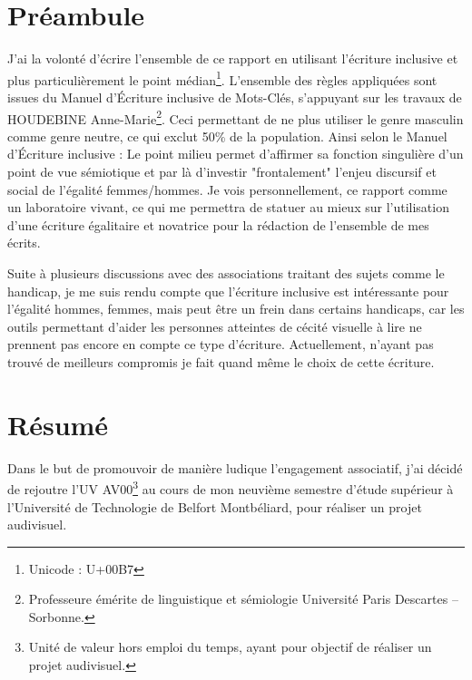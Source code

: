 \documentclass{librairies/lib}
\begin{document}



\newpage
\pagestyle{no_number}

\section*{Préambule}

J'ai la volonté d'écrire l'ensemble de ce rapport en utilisant l'écriture inclusive et plus particulièrement le point médian\footnote{Unicode : U+00B7}.
L'ensemble des règles appliquées sont issues du Manuel d’Écriture inclusive\cite{MEI} de Mots-Clés, s'appuyant sur les travaux de HOUDEBINE Anne-Marie\footnote{Professeure émérite de linguistique et sémiologie Université Paris Descartes – Sorbonne.}.
Ceci permettant de ne plus utiliser le genre masculin comme genre neutre, ce qui exclut 50\% de la population.
Ainsi selon le Manuel d’Écriture inclusive : \og Le point milieu permet d'affirmer sa fonction singulière d'un point de vue sémiotique et par là d'investir "frontalement" l'enjeu discursif et social de l'égalité femmes/hommes. \fg{}
Je vois personnellement, ce rapport comme un laboratoire vivant, ce qui me permettra de statuer au mieux sur l'utilisation d'une écriture égalitaire et novatrice pour la rédaction de l'ensemble de mes écrits.

Suite à plusieurs discussions avec des associations traitant des sujets comme le handicap, je me suis rendu compte que l'écriture inclusive est intéressante pour l'égalité hommes, femmes, mais peut être un frein dans certains handicaps, car les outils permettant d'aider les personnes atteintes de cécité visuelle à lire ne prennent pas encore en compte ce type d'écriture.
Actuellement, n'ayant pas trouvé de meilleurs compromis je fait quand même le choix de cette écriture.


\newpage


\section*{Résumé}

Dans le but de promouvoir de manière ludique l'engagement associatif, j'ai décidé de rejoutre l'UV AV00\footnote{Unité de valeur hors emploi du temps, ayant pour objectif de réaliser un projet audivisuel.} au cours de mon neuvième semestre d'étude supérieur à l'Université de Technologie de Belfort Montbéliard, pour réaliser un projet audivisuel.
\end{document}
